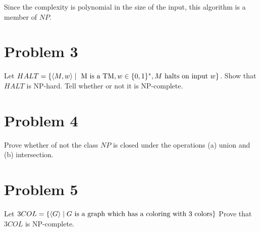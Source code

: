 \documentclass[12pt]{article}
\begin{document}
Since the complexity is polynomial in the size of the input, this algorithm is a member of $NP$.


\section*{Problem 3}
\begin{questionbox}
	Let $HALT = \{ \braket{M, w} \mid \text{ M is a TM}, w \in \{0,1\}^*, M \text { halts on input } w  \}$. Show that $HALT$ is NP-hard. Tell whether or not it is NP-complete.
\end{questionbox}


\section*{Problem 4}

\begin{questionbox}
		Prove whether of not the class $NP$ is closed under the operations (a) union and (b) intersection.
\end{questionbox}

\section*{Problem 5}

\begin{questionbox}
	Let $3COL = \{\braket{G} \mid G \text{ is a graph which has a coloring with 3 colors} \}$ Prove that $3COL$ is
NP-complete.
\end{questionbox}
\end{document}

